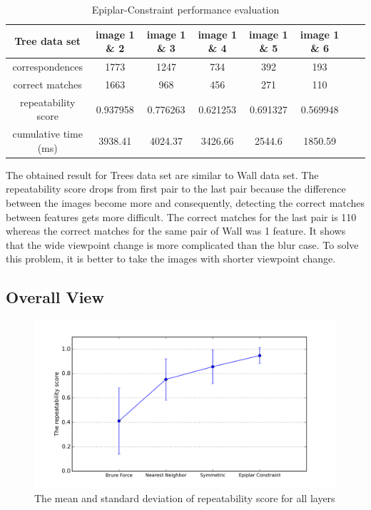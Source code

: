 \begin{table}[H]
  \begin{tabular}{| c || c | c | c | c | c | c | c |}
      \hline
      Tree data set & image 1 \& 2 & image 1 \& 3 & image 1 \& 4 & image 1 \& 5 & image 1 \& 6 \\ \hline \hline
      correspondences & 1773 & 1247 & 734 & 392 & 193 \\ \hline
      correct matches & 1663 & 968 & 456 & 271 & 110 \\ \hline
      repeatability score & 0.937958 & 0.776263 & 0.621253 & 0.691327 & 0.569948 \\ \hline
      cumulative time (ms) & 3938.41 & 4024.37 & 3426.66 & 2544.6 & 1850.59 \\ \hline
  \end{tabular}
  \caption{Epiplar-Constraint performance evaluation} \label{tab:epipolar_matching_tree_eval}
\end{table}

The obtained result for Trees data set are similar to Wall data set. The repeatability score drops from first pair to the last pair because the difference between the images become more and consequently, detecting the correct matches between features gets more difficult. The correct matches for the last pair is 110 whereas the correct matches for the same pair of Wall was 1 feature. It shows that the wide viewpoint change is more complicated than the blur case. To solve this problem, it is better to take the images with shorter viewpoint change. 

\subsection {Overall View}

\begin{figure}[H]
  \centering
  \includegraphics[width=140mm]{figures/error_bar}
  \caption{The mean and standard deviation of repeatability score for all layers}\label{fig:repeatability_matching_statistic}
\end{figure}


